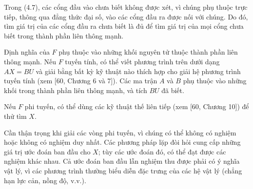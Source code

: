 Trong (4.7), các cổng đầu vào chưa biết không được xét, vì chúng phụ thuộc trực tiếp, thông qua đẳng thức đại số, vào các cổng đầu ra được nối với chúng. Do đó, tìm giá trị của các cổng đầu ra chưa biết là đủ để tìm giá trị của mọi cổng chưa biết trong thành phần liên thông mạnh.

Định nghĩa của $F$ phụ thuộc vào những khối nguyên tử thuộc thành phần liên thông mạnh. Nếu $F$ tuyến tính, có thể viết phương trình trên dưới dạng $AX=BU$ và giải bằng bất kỳ kỹ thuật nào thích hợp cho giải hệ phương trình tuyến tính (xem [60, Chương 6 và 7]). Các ma trận $A$ và $B$ phụ thuộc vào những khối trong thành phần liên thông mạnh, và tích $BU$ đã biết.

Nếu $F$ phi tuyến, có thể dùng các kỹ thuật thế liên tiếp (xem [60, Chương 10]) để thử tìm $X$.

Cần thận trọng khi giải các vòng phi tuyến, vì chúng có thể không có nghiệm hoặc không có nghiệm duy nhất. Các phương pháp lặp đòi hỏi cung cấp những giá trị ước đoán ban đầu cho $X$; tùy các ước đoán đó, có thể đạt được các nghiệm khác nhau. Cả ước đoán ban đầu lẫn nghiệm thu được phải có ý nghĩa vật lý, vì các phương trình thường biểu diễn đặc trưng của các hệ vật lý (chẳng hạn lực cản, nồng độ, v.v.).

